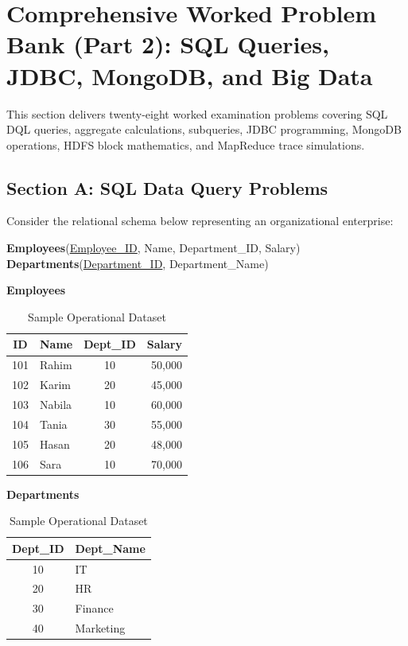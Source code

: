 \section{Comprehensive Worked Problem Bank (Part 2): SQL Queries, JDBC, MongoDB, and Big Data}
\label{sec:dbms_problems_part2}

This section delivers twenty-eight worked examination problems covering SQL DQL queries, aggregate calculations, subqueries, JDBC programming, MongoDB operations, HDFS block mathematics, and MapReduce trace simulations.

\subsection{Section A: SQL Data Query Problems}

Consider the relational schema below representing an organizational enterprise:
\begin{center}
\textbf{Employees}(\underline{Employee\_ID}, Name, Department\_ID, Salary) \\
\textbf{Departments}(\underline{Department\_ID}, Department\_Name)
\end{center}

\begin{table}[htbp]
\centering
\small
\caption{Sample Operational Dataset}
\begin{minipage}{0.55\textwidth}
\centering
\textbf{Employees}
\begin{tabularx}{\textwidth}{c l c r}
\toprule
\textbf{ID} & \textbf{Name} & \textbf{Dept\_ID} & \textbf{Salary} \\
\midrule
101 & Rahim  & 10 & 50,000 \\
102 & Karim  & 20 & 45,000 \\
103 & Nabila & 10 & 60,000 \\
104 & Tania  & 30 & 55,000 \\
105 & Hasan  & 20 & 48,000 \\
106 & Sara   & 10 & 70,000 \\
\bottomrule
\end{tabularx}
\end{minipage}
\hfill
\begin{minipage}{0.40\textwidth}
\centering
\textbf{Departments}
\begin{tabularx}{\textwidth}{c l}
\toprule
\textbf{Dept\_ID} & \textbf{Dept\_Name} \\
\midrule
10 & IT \\
20 & HR \\
30 & Finance \\
40 & Marketing \\
\bottomrule
\end{tabularx}
\end{minipage}
\end{table}

